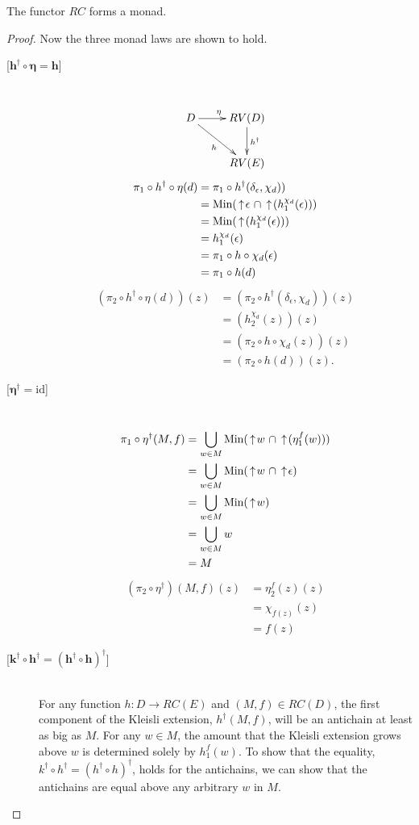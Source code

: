 \begin{theorem}
The functor $RC$ forms a monad.
\end{theorem}
\begin{proof} 
Now the three monad laws are shown to hold.
\begin{description}
\item[{[}$\boldsymbol{h^\dagger\circ \eta = h}${]}] \hfill \\
\[
\xymatrix{
D\ar[r]^\eta\ar[dr]_h & RV(D)\ar[d]^{h^\dagger} \\
& RV(E)
}
\]
\begin{align*}
\pi_1\circ h^\dagger\circ\eta(d) &= \pi_1\circ h^\dagger(\delta_{\epsilon}, \chi_d)) \\
&=\textrm{Min}(\,\uparrow\!\epsilon\ \cap\,\uparrow\!(h_1^{\chi_d}(\epsilon))) \\
&= \textrm{Min}(\,\uparrow\!(h_1^{\chi_d}(\epsilon))) \\
&= h_1^{\chi_d}(\epsilon) \\
&= \pi_1\circ h \circ \chi_d(\epsilon) \\
&= \pi_1\circ h(d)
\end{align*}
\begin{align*}
(\pi_2\circ h^\dagger\circ\eta (d))(z) &= (\pi_2\circ h^\dagger(\delta_\epsilon, \chi_d))(z) \\
&= (h_2^{\chi_d}(z))(z) \\
&= (\pi_2\circ h \circ \chi_d(z))(z) \\
&= (\pi_2\circ h(d))(z).
\end{align*}
\newpage
\item[{[}$\boldsymbol{\eta^\dagger = \mathrm{id}}${]}] \hfill \\
\begin{align*}
\pi_1\circ\eta^\dagger(M,f) &= \bigcup_{w\in M} \textrm{Min}(\,\uparrow\! w\ \cap \,\uparrow\!(\eta_1^f(w))) \\
&= \bigcup_{w\in M} \textrm{Min}(\,\uparrow\! w\ \cap \,\uparrow\! \epsilon) \\
&= \bigcup_{w\in M}\textrm{Min}(\,\uparrow\! w) \\
&= \bigcup_{w\in M} w \\
&= M
\end{align*}
\begin{align*}
(\pi_2\circ \eta^\dagger)(M, f)(z) &= \eta_2^f(z)(z) \\
&= \chi_{f(z)}(z) \\
&= f(z)
\end{align*}
\item[{[}$\boldsymbol{k^\dagger\circ h^\dagger = (h^\dagger\circ h)^\dagger}${]}] \hfill \\
For any function $h:D\rightarrow RC(E)$ and $(M,f)\in RC(D)$, the first component of the Kleisli extension, $h^\dagger (M,f)$, will be an antichain at least as big as $M$.  For any $w\in M$, the amount that the Kleisli extension grows above $w$ is determined solely by $h_1^f(w)$. To show that the equality, $k^\dagger\circ h^\dagger = (h^\dagger\circ h)^\dagger$, holds for the antichains, we can show that the antichains are equal above any arbitrary $w$ in $M$.


\end{description}
\end{proof}
